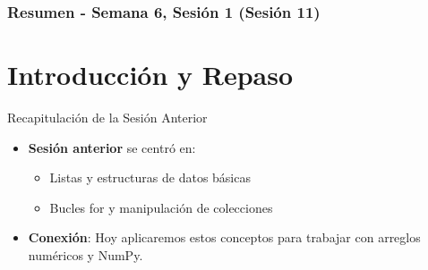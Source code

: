 \documentclass[10pt]{beamer}
\begin{document}
\myfront{}

\begin{frame}
  \titlepage
\end{frame}

\begin{frame}
  \frametitle{Resumen - Semana 6, Sesión 1 (Sesión 11)}
  \tableofcontents
\end{frame}


\section{Introducción y Repaso}
\begin{frame}{Recapitulación de la Sesión Anterior}
  \begin{itemize}
    \item \textbf{Sesión anterior} se centró en:
      \begin{itemize}
        \item Listas y estructuras de datos básicas
        \item Bucles for y manipulación de colecciones
      \end{itemize}
    \item \textbf{Conexión}: Hoy aplicaremos estos conceptos para trabajar con arreglos numéricos y NumPy.
  \end{itemize}
\end{frame}
\end{document}
